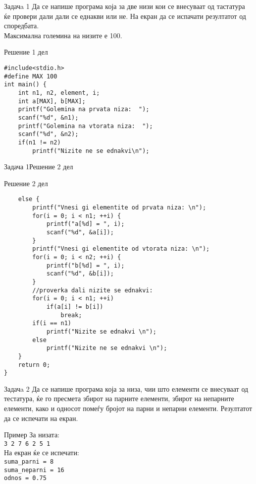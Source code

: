 \begin{frame}[fragile]{Задачa 1}
Да се напише програма која за две низи кои се внесуваат од тастатура ќе провери
дали дали се еднакви или не. На екран да се испачати резултатот од споредбата.\\
Максимална големина на низите е 100.
\pause
\begin{exampleblock}{Решение 1 дел}
\begin{lstlisting}
#include<stdio.h>
#define MAX 100
int main() {
    int n1, n2, element, i;
    int a[MAX], b[MAX];
    printf("Golemina na prvata niza:  ");
    scanf("%d", &n1);
    printf("Golemina na vtorata niza:  ");
    scanf("%d", &n2);
    if(n1 != n2)
        printf("Nizite ne se ednakvi\n");
\end{lstlisting}
\end{exampleblock}
\end{frame}

\begin{frame}[fragile]{Задача 1}{Решение 2 дел}
\begin{exampleblock}{Решение 2 дел}
\begin{lstlisting}
    else {
        printf("Vnesi gi elementite od prvata niza: \n");
        for(i = 0; i < n1; ++i) {
            printf("a[%d] = ", i);
            scanf("%d", &a[i]);
        }
        printf("Vnesi gi elementite od vtorata niza: \n");
        for(i = 0; i < n2; ++i) {
            printf("b[%d] = ", i);            
            scanf("%d", &b[i]);
        }
        //proverka dali nizite se ednakvi:
        for(i = 0; i < n1; ++i)
            if(a[i] != b[i])
                break;
        if(i == n1)
            printf("Nizite se ednakvi \n");
        else
            printf("Nizite ne se ednakvi \n");    
    }
    return 0;
}
\end{lstlisting}
\end{exampleblock}
\end{frame}


\begin{frame}{Задачa 2}
Да се напише програма која за низа, чии што елементи се внесуваат од тестатура, ќе го пресмета збирот на парните елементи, 
збирот на непарните елементи, како и односот помеѓу бројот на парни и непарни елементи. Резултатот да се испечати на екран.
\begin{exampleblock}{Пример}
За низата:\\
\texttt{3 {\color{red}2} 7 {\color{red}6} {\color{red}2} 5 1}\\
На екран ќе се испечати: \\
\texttt{suma\_parni = 8}\\
\texttt{suma\_neparni = 16}\\
\texttt{odnos = 0.75}
\end{exampleblock}
\end{frame}


